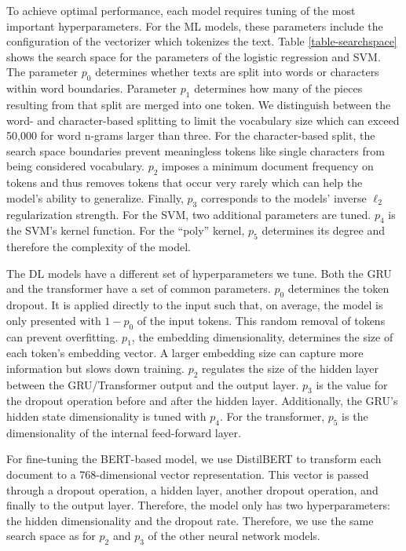 To achieve optimal performance, each model requires tuning of the most important hyperparameters. For the ML models, these parameters include the configuration of the vectorizer which tokenizes the text. Table \ref{table-searchspace} shows the search space for the parameters of the logistic regression and SVM. The parameter $p_0$ determines whether texts are split into words or characters within word boundaries. Parameter $p_1$ determines how many of the pieces resulting from that split are merged into one token. We distinguish between the word- and character-based splitting to limit the vocabulary size which can exceed 50,000 for word n-grams larger than three. For the character-based split, the search space boundaries prevent meaningless tokens like single characters from being considered vocabulary. $p_2$ imposes a minimum document frequency on tokens and thus removes tokens that occur very rarely which can help the model's ability to generalize. Finally, $p_3$ corresponds to the models' inverse $\ell_2$ regularization strength. For the SVM, two additional parameters are tuned. $p_4$ is the SVM's kernel function. For the ``poly'' kernel, $p_5$ determines its degree and therefore the complexity of the model.



The DL models have a different set of hyperparameters we tune. Both the GRU and the transformer have a set of common parameters. $p_0$ determines the token dropout. It is applied directly to the input such that, on average, the model is only presented with $1 - p_0$ of the input tokens. This random removal of tokens can prevent overfitting. $p_1$, the embedding dimensionality, determines the size of each token's embedding vector. A larger embedding size can capture more information but slows down training. $p_2$ regulates the size of the hidden layer between the GRU/Transformer output and the output layer. $p_3$ is the value for the dropout operation before and after the hidden layer. Additionally, the GRU's hidden state dimensionality is tuned with $p_4$. For the transformer, $p_5$ is the dimensionality of the internal feed-forward layer.



For fine-tuning the BERT-based model, we use DistilBERT  to transform each document to a 768-dimensional vector representation. This vector is passed through a dropout operation, a hidden layer, another dropout operation, and finally to the output layer. Therefore, the model only has two hyperparameters: the hidden dimensionality and the dropout rate. Therefore, we use the same search space as for $p_2$ and $p_3$ of the other neural network models.

